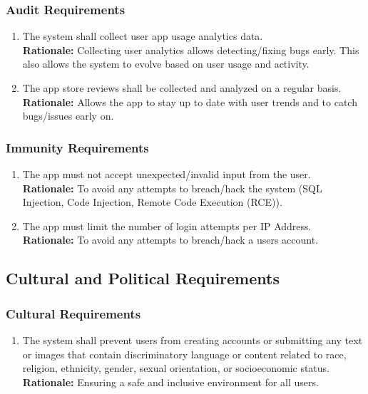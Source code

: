 \documentclass[]{article}
\begin{document}
\subsubsection{Audit Requirements}
\label{ssub:audit_requirements}
\begin{enumerate}[{SR-AU}1. ]
\item The system shall collect user app usage analytics data. \\
\textbf{Rationale:} Collecting user analytics allows detecting/fixing bugs early. This also allows the system to evolve based on user usage and activity.

\item The app store reviews shall be collected and analyzed on a regular basis. \\
\textbf{Rationale:} Allows the app to stay up to date with user trends and to catch bugs/issues early on.
\end{enumerate}

\subsubsection{Immunity Requirements}
\label{ssub:immunity_requirements}
\begin{enumerate}[{SR-IM}1. ]
\item The app must not accept unexpected/invalid input from the user. \\
\textbf{Rationale:} To avoid any attempts to breach/hack the system (SQL Injection, Code Injection, Remote Code Execution (RCE)).
    
\item The app must limit the number of login attempts per IP Address. \\
\textbf{Rationale:} To avoid any attempts to breach/hack a users account.
\end{enumerate}


\subsection{Cultural and Political Requirements}
\label{sub:cultural_and_political_requirements}

\subsubsection{Cultural Requirements}
\label{ssub:cultural_requirements}
\begin{enumerate}[{CP-C}1. ]
    \item The system shall prevent users from creating accounts or submitting any text or images that contain discriminatory language or content related to race, religion, ethnicity, gender, sexual orientation, or socioeconomic status.\\
    \textbf{Rationale:} Ensuring a safe and inclusive environment for all users.

\end{enumerate}
\end{document}
